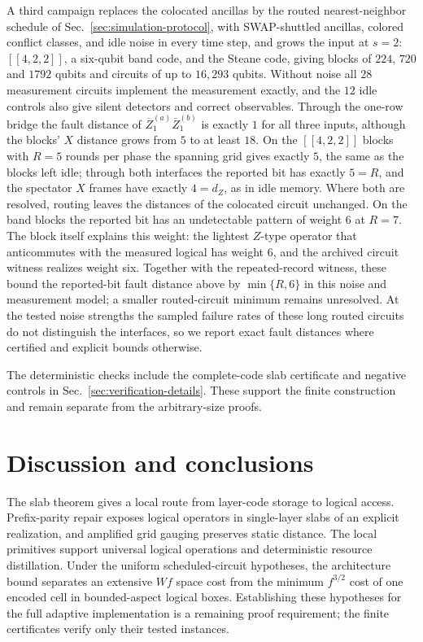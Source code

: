 A third campaign replaces the colocated ancillas by the routed
nearest-neighbor schedule of Sec.~\ref{sec:simulation-protocol}, with SWAP-shuttled ancillas,
colored conflict classes, and idle noise in every time step, and grows the
input at $s=2$: $[[4,2,2]]$, a six-qubit band code, and the Steane code,
giving blocks of $224$, $720$ and $1792$ qubits and circuits of up to
$16{,}293$ qubits.  Without
noise all $28$ measurement circuits implement the measurement exactly, and
the $12$ idle controls also give silent detectors and correct observables.  Through the one-row bridge the
fault distance of $\overline Z_1^{(a)}\overline Z_1^{(b)}$ is exactly $1$ for
all three inputs, although the blocks' $X$ distance grows from $5$ to at
least $18$.  On the $[[4,2,2]]$ blocks with $R=5$ rounds per phase
the spanning grid gives exactly $5$, the same as the blocks left idle;
through both interfaces the reported bit has exactly $5=R$, and the
spectator $X$ frames have exactly $4=d_Z$, as in idle memory.  Where both are
resolved, routing leaves the distances of the colocated circuit unchanged.
On the band blocks the reported bit has an undetectable pattern of weight $6$
at $R=7$.  The block itself explains this weight: the lightest $Z$-type
operator that anticommutes with the measured logical has weight $6$, and the archived circuit witness realizes weight six. Together with
the repeated-record witness, these bound the reported-bit fault distance
above by $\min\{R,6\}$ in this noise and measurement model; a smaller
routed-circuit minimum remains unresolved.  At the tested noise strengths the sampled
failure rates of these long routed circuits do not distinguish the
interfaces, so we report exact fault distances where certified and explicit bounds
otherwise.

The deterministic checks include the complete-code slab certificate and
negative controls in Sec.~\ref{sec:verification-details}. These support
the finite construction and remain separate from the arbitrary-size proofs.

\section{Discussion and conclusions}
The slab theorem gives a local route from layer-code storage to logical
access. Prefix-parity repair exposes logical operators in single-layer
slabs of an explicit realization, and amplified grid gauging preserves
static distance. The local primitives support universal logical operations
and deterministic resource distillation. Under the uniform scheduled-circuit
hypotheses, the architecture bound separates an extensive $Wf$ space cost
from the minimum $f^{3/2}$ cost of one encoded cell in bounded-aspect logical
boxes. Establishing these hypotheses for the full adaptive implementation
is a remaining proof requirement; the finite certificates verify only their
tested instances.

